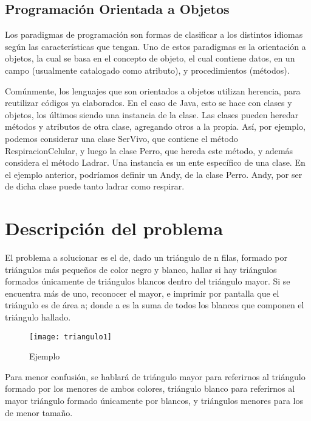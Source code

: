 \documentclass[letterpaper]{article}
\begin{document}
  \subsection{Programaci\'on Orientada a Objetos}
  Los paradigmas de programaci\'on son formas de clasificar a los distintos idiomas
  seg\'un las caracter\'isticas que tengan. Uno de estos paradigmas es la orientaci\'on
  a objetos, la cual se basa en el concepto de objeto, el cual contiene datos,
  en un campo (usualmente catalogado como atributo), y procedimientos (m\'etodos).

  Com\'unmente, los lenguajes que son orientados a objetos utilizan herencia, para
  reutilizar c\'odigos ya elaborados. En el caso de Java, esto se hace con clases y
  objetos, los \'ultimos siendo una instancia de la clase. Las clases pueden heredar
  m\'etodos y atributos de otra clase, agregando otros a la propia. As\'i,
  por ejemplo, podemos considerar una clase SerVivo, que contiene el m\'etodo
  RespiracionCelular, y luego la clase Perro, que hereda este m\'etodo, y adem\'as
  considera el m\'etodo Ladrar. Una instancia es un ente espec\'ifico de una
  clase. En el ejemplo anterior, podr\'iamos definir un Andy, de la clase Perro. Andy,
  por ser de dicha clase puede tanto ladrar como respirar.


  \newpage
  \section{Descripci\'on del problema}


  El problema a solucionar es el de, dado un tri\'angulo de n filas,
  formado por tri\'angulos m\'as peque\~nos de color negro y blanco, hallar si hay
  tri\'angulos formados \'unicamente de tri\'angulos blancos dentro del tri\'angulo
  mayor. Si se encuentra m\'as de uno, reconocer el mayor, e imprimir por pantalla
  que el tri\'angulo es de \'area a; donde a es la suma de todos los blancos que
  componen el tri\'angulo hallado.


    \begin{figure}[h!]
      \centering
      \texttt{[image: triangulo1]}
      \caption{Ejemplo}
    \end{figure}

  Para menor confusi\'on, se hablar\'a de tri\'angulo mayor para
  referirnos al tri\'angulo formado por los menores de ambos colores, tri\'angulo
  blanco para referirnos al mayor tri\'angulo formado \'unicamente por blancos, y
  tri\'angulos menores para los de menor tama\~no.
\end{document}
